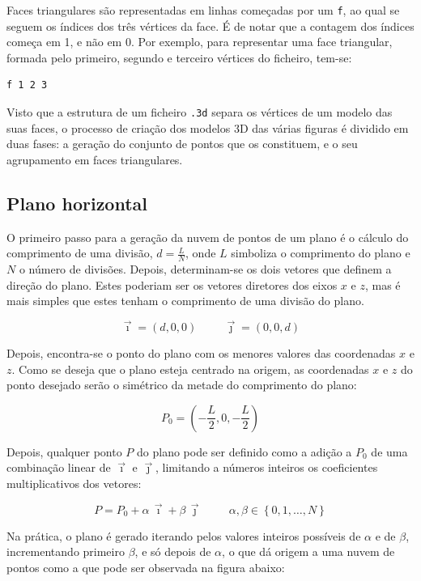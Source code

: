 \documentclass[12pt, a4paper]{article}
\begin{document}
Faces triangulares são representadas em linhas começadas por um \texttt{f}, ao qual se seguem os
índices dos três vértices da face. É de notar que a contagem dos índices começa em 1, e não em 0.
Por exemplo, para representar uma face triangular, formada pelo primeiro, segundo e terceiro
vértices do ficheiro, tem-se:

\begin{verbatim}
f 1 2 3
\end{verbatim}

Visto que a estrutura de um ficheiro \texttt{.3d} separa os vértices de um modelo das suas faces, o
processo de criação dos modelos 3D das várias figuras é dividido em duas fases: a geração do
conjunto de pontos que os constituem, e o seu agrupamento em faces triangulares.

\subsection{Plano horizontal}

O primeiro passo para a geração da nuvem de pontos de um plano é o cálculo do comprimento de uma
divisão, $d = \frac{L}{N}$, onde $L$ simboliza o comprimento do plano e $N$ o número de divisões.
Depois, determinam-se os dois vetores que definem a direção do plano. Estes poderiam ser os vetores
diretores dos eixos $x$ e $z$, mas é mais simples que estes tenham o comprimento de uma divisão do
plano.

$$
\vec{\imath} = (d, 0, 0)
\hspace{1cm}
\vec{\jmath} = (0, 0, d)
$$

Depois, encontra-se o ponto do plano com os menores valores das coordenadas $x$ e $z$. Como se
deseja que o plano esteja centrado na origem, as coordenadas $x$ e $z$ do ponto desejado serão o
simétrico da metade do comprimento do plano:

$$
P_0 = \left ( - \frac{L}{2}, 0, - \frac{L}{2} \right )
$$

Depois, qualquer ponto $P$ do plano pode ser definido como a adição a $P_0$ de uma combinação linear
de $\vec{\imath}$ e $\vec{\jmath}$, limitando a números inteiros os coeficientes multiplicativos dos
vetores:

$$
P = P_0 + \alpha \, \vec{\imath} + \beta \, \vec{\jmath}
\hspace{1cm}
\alpha, \beta \in \left \lbrace 0, 1, \ldots, N \right \rbrace
$$

Na prática, o plano é gerado iterando pelos valores inteiros possíveis de $\alpha$ e de $\beta$,
incrementando primeiro $\beta$, e só depois de $\alpha$, o que dá origem a uma nuvem de pontos como
a que pode ser observada na figura abaixo:
\end{document}
